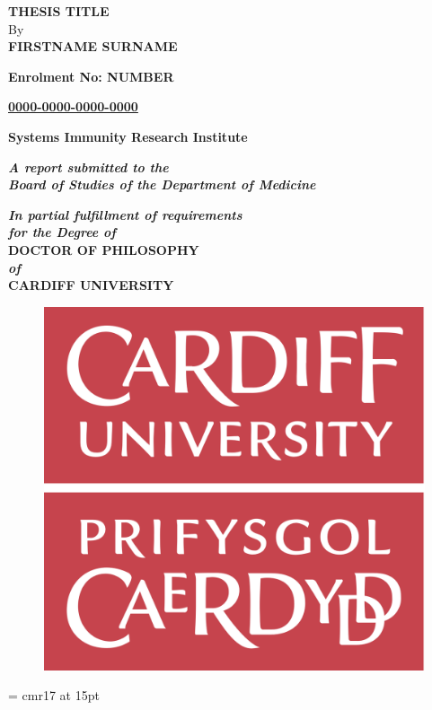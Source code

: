 \begin{changemargin}{0cm}{0cm}
\thispagestyle{empty}
\baselineskip25pt
\begin{center}
{\Large {\bf THESIS TITLE}}\\

By\\
{\bf FIRSTNAME SURNAME}

{\bf Enrolment No: NUMBER}

{\bf 
\href{https://orcid.org/0009-0000-0000-0000}{0000-0000-0000-0000}\,}
\end{center}

\vfill
\baselineskip15pt
\begin{center}
\textbf{Systems Immunity Research Institute}
\end{center}

\vfill
\baselineskip15pt
\begin{center}
{\bf {\em A report submitted to the \\
\bigskip
Board of Studies of the Department of Medicine
}}
\end{center}
\baselineskip25pt

\vfill
\begin{center} 
{\bf {\em In partial fulfillment of requirements}} \\
{\bf {\em for the Degree of}} \\

{\large{\bf DOCTOR OF PHILOSOPHY}} \\
 {\bf {\em of }} \\
{\bf {\large CARDIFF UNIVERSITY}} \\

\end{center}



\vfill
\begin{center}
\begin{figure}[h!]
\centering
\includegraphics[scale=.15]{logos/culogo.png}
\end{figure}
\hfill \break
\font\tenrm = cmr17 at 15pt
\end{center}
\end{changemargin}


